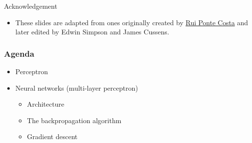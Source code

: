 \documentclass[10pt]{beamer}
\begin{document}

\begin{frame}
  \titlepage
\end{frame}
\begin{titledslide}{Acknowledgement}

  \begin{itemize}
  \item These slides are adapted from ones originally created by
    \href{https://www.dpag.ox.ac.uk/team/rui-ponte-costa}{Rui Ponte
      Costa} and later edited by Edwin Simpson and James Cussens. 
  \end{itemize}
  
\end{titledslide}
\begin{frame}[fragile]
  
  \frametitle{Agenda}
  \begin{itemize}
  \item Perceptron
  \item Neural networks (multi-layer perceptron)
    \begin{itemize}
    \item Architecture
    \item The backpropagation algorithm
    \item Gradient descent
    \end{itemize}
  \end{itemize}

\end{frame}
\end{document}
